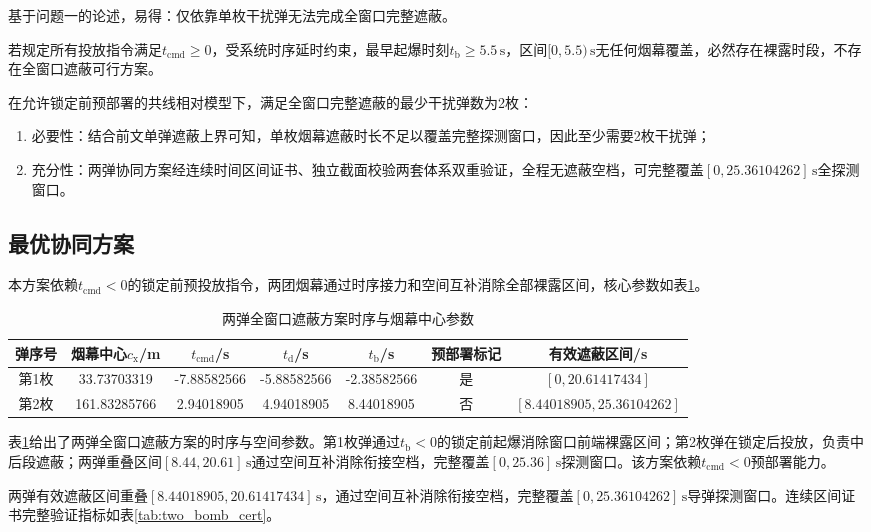 \documentclass[withoutpreface,bwprint]{cumcmthesis}
\renewcommand{\textbf}[1]{{\song\bfseries #1}}
\begin{document}
基于问题一的论述，易得：仅依靠单枚干扰弹无法完成全窗口完整遮蔽。

若规定所有投放指令满足$t_{\text{cmd}}\ge0$，受系统时序延时约束，最早起爆时刻$t_{\mathrm{b}}\ge5.5\,\text{s}$，区间$[0,5.5)\,\text{s}$无任何烟幕覆盖，必然存在裸露时段，不存在全窗口遮蔽可行方案。

在允许锁定前预部署的共线相对模型下，满足全窗口完整遮蔽的最少干扰弹数为2枚：
\begin{enumerate}
	\item 必要性：结合前文单弹遮蔽上界可知，单枚烟幕遮蔽时长不足以覆盖完整探测窗口，因此至少需要2枚干扰弹；
	\item 充分性：两弹协同方案经连续时间区间证书、独立截面校验两套体系双重验证，全程无遮蔽空档，可完整覆盖$[0,25.36104262]\,\text{s}$全探测窗口。
\end{enumerate}


\subsection{最优协同方案}
本方案依赖$t_{\text{cmd}}<0$的锁定前预投放指令，两团烟幕通过时序接力和空间互补消除全部裸露区间\cite{liu2026smoke}，核心参数如表\ref{tab:two_bomb_schedule}。

\begin{table}[htbp]
	\centering
	\caption{两弹全窗口遮蔽方案时序与烟幕中心参数}
	\label{tab:two_bomb_schedule}
	\begin{tabular}{c|c|c|c|c|c|c}
		\hline
		\textbf{弹序号} & \textbf{烟幕中心$c_{\mathrm{x}}$/m} & $t_{\text{cmd}}$/s & $t_{\mathrm{d}}$/s & $t_{\mathrm{b}}$/s & 预部署标记 & 有效遮蔽区间/s \\
		\hline
		第1枚 & 33.73703319 & -7.88582566 & -5.88582566 & -2.38582566 & 是 & $[0, 20.61417434]$ \\
		第2枚 & 161.83285766 & 2.94018905 & 4.94018905 & 8.44018905 & 否 & $[8.44018905, 25.36104262]$ \\
		\hline
	\end{tabular}
\end{table}

\noindent\textbf{分析与结论：}
	
表\ref{tab:two_bomb_schedule}给出了两弹全窗口遮蔽方案的时序与空间参数。第1枚弹通过$t_{\mathrm{b}}<0$的锁定前起爆消除窗口前端裸露区间；第2枚弹在锁定后投放，负责中后段遮蔽；两弹重叠区间$[8.44,20.61]\,\text{s}$通过空间互补消除衔接空档，完整覆盖$[0,25.36]\,\text{s}$探测窗口。该方案依赖$t_{\text{cmd}}<0$预部署能力。

两弹有效遮蔽区间重叠$[8.44018905,20.61417434]\,\text{s}$，通过空间互补消除衔接空档，完整覆盖$[0,25.36104262]\,\text{s}$导弹探测窗口。连续区间证书完整验证指标如表\ref{tab:two_bomb_cert}。
\end{document}
